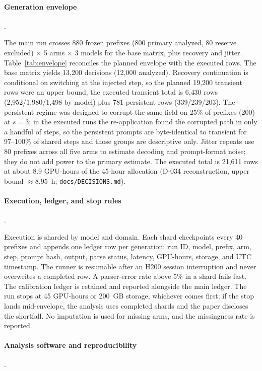 \documentclass[a4paper,fleqn]{cas-sc}
\begin{document}
\paragraph{Generation envelope}.\

The main run crosses 880 frozen prefixes (800 primary analyzed, 80 reserve excluded)
$\times$ 5 arms $\times$ 3 models for the base matrix,
plus recovery and jitter. Table~\ref{tab:envelope} reconciles the planned envelope with the
executed rows. The base matrix yields
13{,}200 decisions (12{,}000 analyzed). Recovery continuation is conditional on switching at
the injected step, so the planned 19{,}200 transient rows were an upper bound; the executed
transient total is 6{,}430 rows (2{,}952/1{,}980/1{,}498 by model) plus 781 persistent rows
(339/239/203). The persistent regime was designed to corrupt the same field
on 25\% of prefixes (200) at $s=3$; in the executed runs the re-application found the corrupted
path in only a handful of steps, so the persistent prompts are byte-identical to transient for
97--100\% of shared steps and those groups are descriptive only. Jitter repeats use 80 prefixes
across all five arms to estimate decoding and prompt-format noise; they do not add power to the
primary estimate. The executed total is 21{,}611 rows at about 8.9 GPU-hours of the 45-hour
allocation (D-034 reconstruction, upper bound $\approx$8.95~h; \texttt{docs/DECISIONS.md}).


\paragraph{Execution, ledger, and stop rules}.\

Execution is sharded by model and domain. Each shard checkpoints every 40 prefixes and appends
one ledger row per generation: run ID, model, prefix, arm, step, prompt hash, output, parse
status, latency, GPU-hours, storage, and UTC timestamp. The runner is resumable after an H200
session interruption and never overwrites a completed row. A parser-error rate above 5\% in a
shard fails fast. The calibration ledger is retained and reported alongside the main ledger. The
run stops at 45 GPU-hours or 200~GB storage, whichever comes first; if the stop lands
mid-envelope, the analysis uses completed shards and the paper discloses the shortfall. No
imputation is used for missing arms, and the missingness rate is reported.

\paragraph{Analysis software and reproducibility}.\
\end{document}
